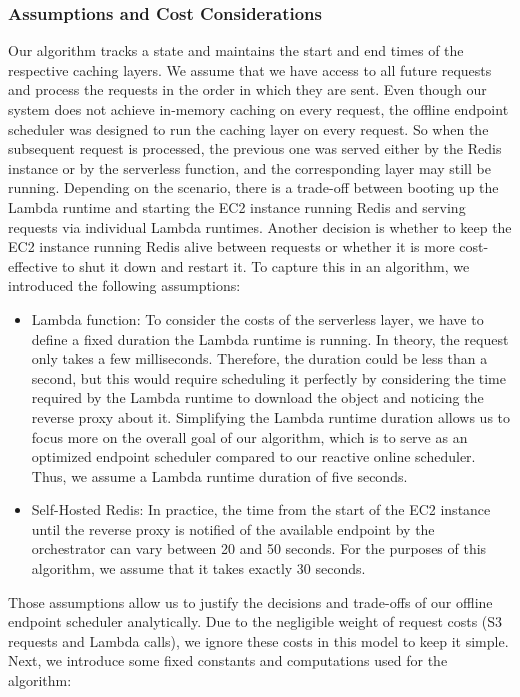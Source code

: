 \subsubsection{Assumptions and Cost Considerations}
Our algorithm tracks a state and maintains the start and end times of the respective caching layers. We assume that we have access to all future requests and process the requests in the order in which they are sent. Even though our system does not achieve in-memory caching on every request, the offline endpoint scheduler was designed to run the caching layer on every request. So when the subsequent request is processed, the previous one was served either by the Redis instance or by the serverless function, and the corresponding layer may still be running. Depending on the scenario, there is a trade-off between booting up the Lambda runtime and starting the EC2 instance running Redis and serving requests via individual Lambda runtimes. Another decision is whether to keep the EC2 instance running Redis alive between requests or whether it is more cost-effective to shut it down and restart it. To capture this in an algorithm, we introduced the following assumptions:
\begin{itemize}
    \item Lambda function: To consider the costs of the serverless layer, we have to define a fixed duration the Lambda runtime is running. In theory, the request only takes a few milliseconds. Therefore, the duration could be less than a second, but this would require scheduling it perfectly by considering the time required by the Lambda runtime to download the object and noticing the reverse proxy about it. Simplifying the Lambda runtime duration allows us to focus more on the overall goal of our algorithm, which is to serve as an optimized endpoint scheduler compared to our reactive online scheduler. Thus, we assume a Lambda runtime duration of five seconds.
    \item Self-Hosted Redis: In practice, the time from the start of the EC2 instance until the reverse proxy is notified of the available endpoint by the orchestrator can vary between 20 and 50 seconds. For the purposes of this algorithm, we assume that it takes exactly 30 seconds.
\end{itemize}
Those assumptions allow us to justify the decisions and trade-offs of our offline endpoint scheduler analytically. Due to the negligible weight of request costs (S3 requests and Lambda calls), we ignore these costs in this model to keep it simple. Next, we introduce some fixed constants and computations used for the algorithm:
